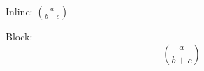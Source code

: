 \documentclass{sample}
\begin{document}
\begin{center}
    Inline: $\binom{a}{b+c}$

    Block: \[
        \binom{a}{b+c}
    \]
\end{center}
\end{document}
